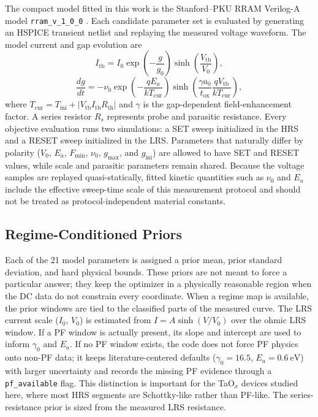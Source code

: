 \documentclass[journal]{IEEEtran}
\begin{document}
The compact model fitted in this work is the Stanford--PKU RRAM Verilog-A
model \texttt{rram\_v\_1\_0\_0}
\cite{guan2012spice,jiang2016verification}.  Each candidate parameter set is
evaluated by generating an HSPICE transient netlist and replaying the
measured voltage waveform.  The model current and gap evolution are
\begin{equation}
  I_{\mathrm{tb}}
  = I_0 \exp\left(-\frac{g}{g_0}\right)
    \sinh\left(\frac{V_{\mathrm{tb}}}{V_0}\right),
  \label{eq:stanford-current}
\end{equation}
\begin{equation}
  \frac{dg}{dt}
  =
  -\nu_0
  \exp\left(-\frac{qE_a}{kT_{\mathrm{cur}}}\right)
  \sinh\left(
    \frac{\gamma a_0}{t_{\mathrm{ox}}}
    \frac{qV_{\mathrm{tb}}}{kT_{\mathrm{cur}}}
  \right),
  \label{eq:stanford-gap}
\end{equation}
where $T_{\mathrm{cur}} = T_{\mathrm{ini}} +
|V_{\mathrm{tb}}I_{\mathrm{tb}}R_{\mathrm{th}}|$ and $\gamma$ is the
gap-dependent field-enhancement factor.  A series resistor $R_s$ represents
probe and parasitic resistance.  Every objective evaluation runs two
simulations: a SET sweep initialized in the HRS and a RESET sweep initialized
in the LRS.  Parameters that naturally differ by polarity ($V_0$, $E_a$,
$F_{\min}$, $\nu_0$, $g_{\max}$, and $g_{\mathrm{ini}}$) are allowed to have
SET and RESET values, while scale and parasitic parameters remain shared.
Because the voltage samples are replayed quasi-statically, fitted kinetic
quantities such as $\nu_0$ and $E_a$ include the effective sweep-time scale of
this measurement protocol and should not be treated as protocol-independent
material constants.

\subsection{Regime-Conditioned Priors}
\label{sec:priors}

Each of the 21 model parameters is assigned a prior mean, prior standard
deviation, and hard physical bounds.  These priors are not meant to force a
particular answer; they keep the optimizer in a physically reasonable region
when the DC data do not constrain every coordinate.  When a regime map is
available, the prior windows are tied to the classified parts of the measured
curve.  The LRS current scale ($I_0$, $V_0$) is estimated from
$I=A\sinh(V/V_0)$ over the ohmic LRS window.  If a PF window is actually
present, its slope and intercept are used to inform $\gamma_0$ and $E_a$.
If no PF window exists, the code does not force PF physics onto non-PF data;
it keeps literature-centered defaults ($\gamma_0=16.5$,
$E_a=\SI{0.6}{\electronvolt}$) with larger uncertainty and records the
missing PF evidence through a \texttt{pf\_available} flag.  This distinction
is important for the TaO$_x$ devices studied here, where most HRS segments
are Schottky-like rather than PF-like.  The series-resistance prior is sized
from the measured LRS resistance.
\end{document}

